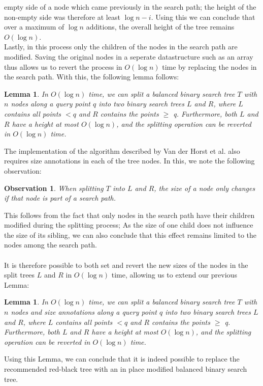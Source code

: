 \documentclass{article}
\newtheorem{lemma}[theorem]{Lemma}
\newtheorem{observation}{Observation}[theorem]
\begin{document}
empty side of a node which came previously in the search path; the height of
the non-empty side was therefore at least $\log n - i$. Using this we can
conclude that over a maximum of $\log n$ additions, the overall height of the
tree remains $O(\log n)$.\\ Lastly, in this process only the children of the
nodes in the search path are modified. Saving the original nodes in a seperate
datastructure such as an array thus allows us to revert the process in $O(\log
    n)$ time by replacing the nodes in the search path. With this, the following
lemma follows: \\
\begin{lemma}
    In $O(\log n)$ time, we can split a balanced binary search tree $T$ with $n$ nodes along a query point $q$ into two binary search trees $L$ and $R$, where $L$ contains all points $<q$ and $R$ contains the points $\geq$ q. Furthermore, both $L$ and $R$ have a height at most $O(\log n)$, and the splitting operation can be reverted in $O(\log n)$ time.
\end{lemma}
The implementation of the algorithm described by Van der Horst et al. also requires size annotations in each of the tree nodes. In this, we note the following observation:
\begin{observation}
    When splitting $T$ into $L$ and $R$, the size of a node only changes if that node is part of a search path.
\end{observation}
This follows from the fact that only nodes in the search path have their children modified during the splitting process; As the size of one child does not influence the size of its sibling, we can also conclude that this effect remains limited to the nodes among the search path. \\\\
It is therefore possible to both set and revert the new sizes of the nodes in the split trees $L$ and $R$ in $O(\log n)$ time, allowing us to extend our previous Lemma:
\begin{lemma}
    In $O(\log n)$ time, we can split a balanced binary search tree $T$ with $n$ nodes and size annotations along a query point $q$ into two binary search trees $L$ and $R$, where $L$ contains all points $<q$ and $R$ contains the points $\geq$ q. Furthermore, both $L$ and $R$ have a height at most $O(\log n)$, and the splitting operation can be reverted in $O(\log n)$ time.
\end{lemma}
Using this Lemma, we can conclude that it is indeed possible to replace the recommended red-black tree with an in place modified balanced binary search tree.
\end{document}
